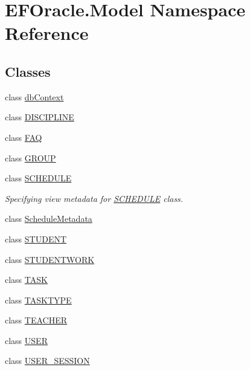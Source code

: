 \hypertarget{namespace_e_f_oracle_1_1_model}{}\section{E\+F\+Oracle.\+Model Namespace Reference}
\label{namespace_e_f_oracle_1_1_model}
\subsection*{Classes}
\begin{DoxyCompactItemize}
\item 
class \hyperlink{class_e_f_oracle_1_1_model_1_1db_context}{db\+Context}
\item 
class \hyperlink{class_e_f_oracle_1_1_model_1_1_d_i_s_c_i_p_l_i_n_e}{D\+I\+S\+C\+I\+P\+L\+I\+NE}
\item 
class \hyperlink{class_e_f_oracle_1_1_model_1_1_f_a_q}{F\+AQ}
\item 
class \hyperlink{class_e_f_oracle_1_1_model_1_1_g_r_o_u_p}{G\+R\+O\+UP}
\item 
class \hyperlink{class_e_f_oracle_1_1_model_1_1_s_c_h_e_d_u_l_e}{S\+C\+H\+E\+D\+U\+LE}
\begin{DoxyCompactList}\small\item\em Specifying view metadata for \hyperlink{class_e_f_oracle_1_1_model_1_1_s_c_h_e_d_u_l_e}{S\+C\+H\+E\+D\+U\+LE} class. \end{DoxyCompactList}\item 
class \hyperlink{class_e_f_oracle_1_1_model_1_1_schedule_metadata}{Schedule\+Metadata}
\item 
class \hyperlink{class_e_f_oracle_1_1_model_1_1_s_t_u_d_e_n_t}{S\+T\+U\+D\+E\+NT}
\item 
class \hyperlink{class_e_f_oracle_1_1_model_1_1_s_t_u_d_e_n_t_w_o_r_k}{S\+T\+U\+D\+E\+N\+T\+W\+O\+RK}
\item 
class \hyperlink{class_e_f_oracle_1_1_model_1_1_t_a_s_k}{T\+A\+SK}
\item 
class \hyperlink{class_e_f_oracle_1_1_model_1_1_t_a_s_k_t_y_p_e}{T\+A\+S\+K\+T\+Y\+PE}
\item 
class \hyperlink{class_e_f_oracle_1_1_model_1_1_t_e_a_c_h_e_r}{T\+E\+A\+C\+H\+ER}
\item 
class \hyperlink{class_e_f_oracle_1_1_model_1_1_u_s_e_r}{U\+S\+ER}
\item 
class \hyperlink{class_e_f_oracle_1_1_model_1_1_u_s_e_r___s_e_s_s_i_o_n}{U\+S\+E\+R\+\_\+\+S\+E\+S\+S\+I\+ON}
\end{DoxyCompactItemize}
